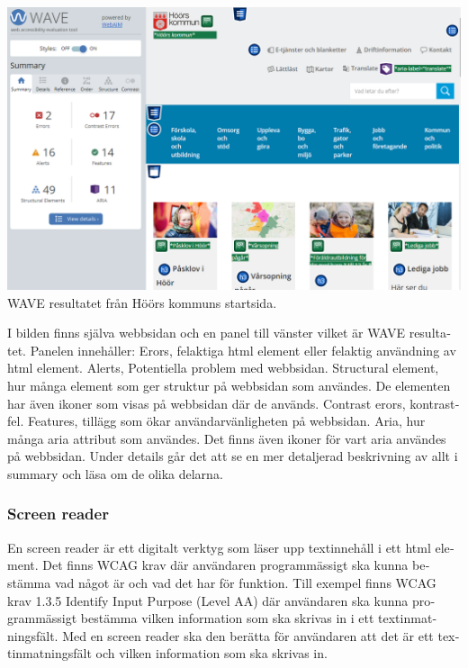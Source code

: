\documentclass[11p]{article}
\begin{document}
\begin{otherlanguage}{swedish}
    \begin{center}
    \includegraphics[width=1\textwidth]{../images/höörsKommunhemsida_WAVE.png} %
    WAVE resultatet från Höörs kommuns startsida.
    \end{center}
    I bilden finns själva webbsidan och en panel till vänster vilket är WAVE resultatet.
    Panelen innehåller:
    Erors, felaktiga html element eller felaktig användning av html element.
    Alerts, Potentiella problem med webbsidan.
    Structural element, hur många element som ger struktur på webbsidan som användes.
    De elementen har även ikoner som visas på webbsidan där de används.
    Contrast erors, kontrastfel.
    Features, tillägg som ökar användarvänligheten på webbsidan.
    Aria, hur många aria attribut som användes.
    Det finns även ikoner för vart aria användes på webbsidan.
    Under details går det att se en mer detaljerad beskrivning av allt i summary och läsa om de olika delarna.


    \subsubsection{Screen reader} %

    En screen reader är ett digitalt verktyg som läser upp textinnehåll i ett html element.
    Det finns WCAG krav där användaren programmässigt ska kunna bestämma vad något är och vad det har för funktion.
    Till exempel finns WCAG krav 1.3.5 Identify Input Purpose (Level AA) där användaren ska kunna programmässigt bestämma vilken information som ska skrivas in i ett textinmatningsfält.
    Med en screen reader ska den berätta för användaren att det är ett textinmatningsfält och vilken information som ska skrivas in.


\end{otherlanguage}
\end{document}
